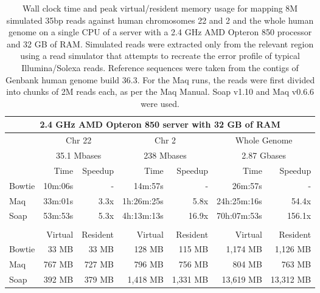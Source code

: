\documentclass[letterpaper]{article}
\begin{document}
\begin{table}[tp]
\scriptsize
\begin{tabular}{lrrrrrr}
\multicolumn{7}{c}{\small{2.4 GHz AMD Opteron 850 server with 32 GB of RAM}} \\[3pt] 
\toprule
 & \multicolumn{2}{c}{Chr 22} & \multicolumn{2}{c}{Chr 2} & \multicolumn{2}{c}{Whole Genome} \\[3pt] 
 & \multicolumn{2}{c}{35.1 Mbases} & \multicolumn{2}{c}{238 Mbases} & \multicolumn{2}{c}{2.87 Gbases} \\[3pt] 
 & Time & Speedup & Time & Speedup & Time & Speedup \\ 
\toprule
Bowtie & 10m:06s & - & 14m:57s & - & 26m:57s & -  \\ \midrule 
Maq & 33m:01s & 3.3x & 1h:26m:25s & 5.8x & 24h:25m:16s & 54.4x  \\ \midrule 
Soap & 53m:53s & 5.3x & 4h:13m:13s & 16.9x & 70h:07m:53s & 156.1x  \\[2pt] \bottomrule \\ 
 & Virtual & Resident & Virtual & Resident & Virtual & Resident \\ 
\toprule
Bowtie & 33 MB & 33 MB & 128 MB & 115 MB & 1,174 MB & 1,126 MB  \\ \midrule 
Maq & 767 MB & 727 MB & 796 MB & 756 MB & 804 MB & 763 MB  \\ \midrule 
Soap & 392 MB & 379 MB & 1,418 MB & 1,331 MB & 13,619 MB & 13,312 MB  \\ 
\bottomrule
\end{tabular}
\scriptsize\caption{Wall clock time and peak virtual/resident memory usage for mapping 8M simulated 35bp reads against human chromosomes 22 and 2 and the whole human genome on a single CPU of a server with a 2.4 GHz AMD Opteron 850 processor and 32 GB of RAM. Simulated reads were extracted only from the relevant region using a read simulator that attempts to recreate the error profile of typical Illumina/Solexa reads. Reference sequences were taken from the contigs of Genbank human genome build 36.3. For the Maq runs, the reads were first divided into chunks of 2M reads each, as per the Maq Manual. Soap v1.10 and Maq v0.6.6 were used.}
\end{table}
\end{document}
